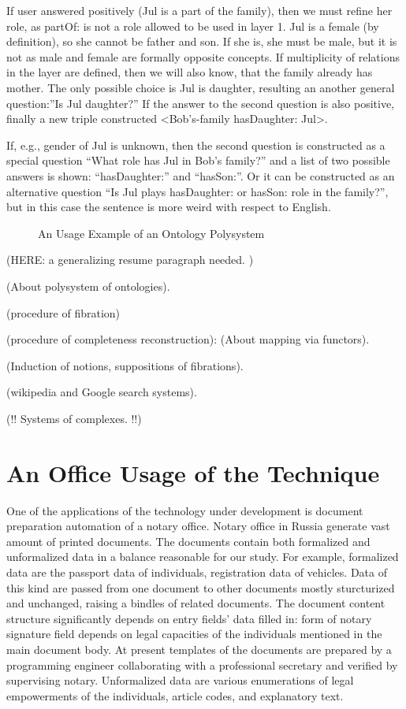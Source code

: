 \documentclass[utf8]{../IncArticle}
\begin{document}
If user answered positively (Jul is a part of the family), then we must refine her role, as partOf: is not a role allowed to be used in layer 1.  Jul is a female (by definition), so she cannot be father and son.  If she is, she must be male, but it is not as male and female are formally opposite concepts.  If multiplicity of relations in the layer are defined, then we will also know, that the family already has mother.  The only possible choice is Jul is daughter, resulting an another general question:''Is Jul daughter?'' If the answer to the second question is also positive, finally a new triple constructed <Bob's-family hasDaughter: Jul>.

If, e.g., gender of Jul is unknown, then the second question is constructed as a special question ``What role has Jul in Bob's family?'' and a list of two possible answers is shown: ``hasDaughter:'' and ``hasSon:''.  Or it can be constructed as an alternative question ``Is Jul plays hasDaughter: or hasSon: role in the family?'', but in this case the sentence is more weird with respect to English.

\begin{figure}
\centering\sf
\def\svgwidth{0.9\linewidth}

\caption{An  Usage Example of an Ontology Polysystem}
\label{OPSA}
\end{figure}



(HERE: a generalizing resume paragraph needed.  )

(About polysystem of ontologies).

(procedure of fibration)

(procedure of completeness reconstruction): (About mapping via functors).

(Induction of notions, suppositions of fibrations).

(wikipedia and Google search systems).

(!! Systems of complexes. !!)

\section{An Office Usage of the Technique}

One of the applications of the technology under development is document preparation automation of a notary office.  Notary office in Russia generate vast amount of printed documents.  The documents contain both formalized and unformalized data in a balance reasonable for our study.  For example, formalized data are the passport data of individuals, registration data of vehicles.  Data of this kind are passed from one document to other documents mostly sturcturized and unchanged, raising a bindles of related documents.  The document content structure significantly depends on entry fields’ data filled in: form of notary signature field depends on legal capacities of the individuals mentioned in the main document body.  At present templates of the documents are prepared by a programming engineer collaborating with a professional secretary and verified by supervising notary.  Unformalized data are various enumerations of legal empowerments of the individuals, article codes, and explanatory text.
\end{document}
